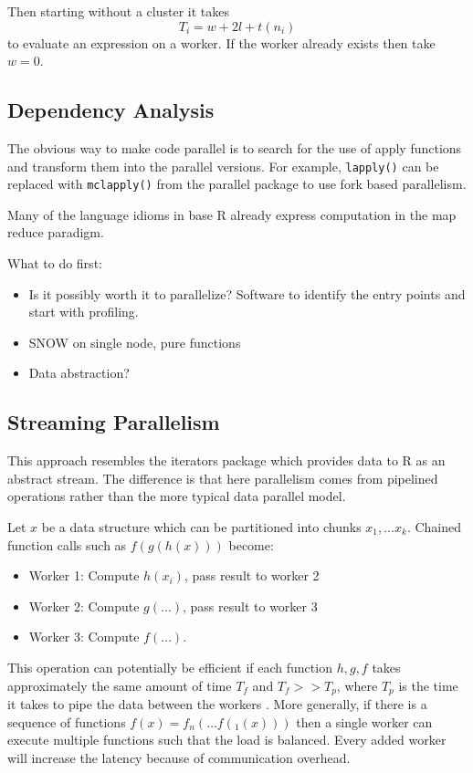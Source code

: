 \documentclass[12pt]{article}
\begin{document}
Then starting without a cluster it takes
\[
    T_i = w + 2l + t(n_i)
\]
to evaluate an expression on a worker. If the worker already exists then
take $w = 0$.

\subsection{Dependency Analysis}


The obvious way to make code parallel is to search for the use of
apply functions and transform them into the parallel versions. For example, 
\texttt{lapply()} can be replaced with \texttt{mclapply()} from the
parallel package to use fork based parallelism.

Many of the language idioms in base R already express computation in the
map reduce paradigm.


What to do first:

\begin{itemize}
    \item Is it possibly worth it to parallelize? Software to identify the
        entry points and start with profiling.
    \item SNOW on single node, pure functions
    \item Data abstraction?
\end{itemize}

\subsection{Streaming Parallelism}

This approach resembles the iterators package \cite{R-iterators} which
provides data to R as an abstract stream. The difference is that here
parallelism comes from pipelined operations rather than the more typical
data parallel model.

Let $x$ be a data structure which can be partitioned into chunks $x_1,
\dots x_k$. Chained function calls such as $f(g(h(x)))$ become:

\begin{itemize}
    \item Worker 1: Compute $h(x_i)$, pass result to worker 2
    \item Worker 2: Compute $g(\dots)$, pass result to worker 3
    \item Worker 3: Compute $f(\dots)$.
\end{itemize}

This operation can potentially be efficient if each function $h, g,
f$ takes approximately the same amount of time $T_f$ and $T_f >> T_p$,
where $T_p$ is the time it takes to pipe the data between the 
workers \cite{arnold2015iotools}. More generally, if there is a sequence of
functions $f(x) = f_n(\dots f(_1(x)))$ then a single worker can execute
multiple functions such that the load is balanced. Every added worker will
increase the latency because of communication overhead.
\end{document}
